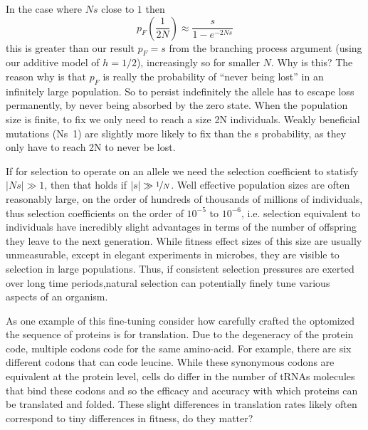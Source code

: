 In the case where $Ns$ close to $1$ then
\begin{equation}
p_F \left( \frac{1}{2N} \right) \approx \frac{s}{1-e^{-2Ns}} \label{eqn:escape_from_intro}
\end{equation}
this is greater than our result $p_F=s$ from the branching process
argument (using our additive model of $h=1/2$), increasingly so for smaller $N$. 
Why is this?  The reason why is that $p_F$ is really the probability
of “never being lost” in an infinitely large population. So to persist
indefinitely the allele has to escape loss permanently, by never being
absorbed by the zero state. When the population size is finite, to fix
we only need to reach a size 2N individuals. Weakly beneficial
mutations (Ns~1) are slightly more likely to fix than the s
probability, as they only have to reach 2N to never be lost.

If for selection to operate on an allele we need the selection coefficient to statisfy
$|Ns|\gg 1$, then that holds if $|s|\gg \nicefrac{1}{N}$. 
Well effective population sizes are often reasonably large, on the
order of hundreds of thousands of millions of individuals, thus selection
coefficients on the order of $10^{-5}$ to $10^{-6}$, i.e. selection
equivalent to individuals have incredibly slight advantages in terms
of the number of offspring they leave to the next generation.
While fitness effect sizes of this size are usually unmeasurable,
except in elegant experiments in microbes, they are visible to
selection in large populations. Thus, if consistent selection pressures are exerted over long
time periods,natural selection can potentially finely tune various
aspects of an organism.

As one example of this fine-tuning consider how carefully crafted the
optomized the sequence of proteins is for translation. Due to the
degeneracy of the protein code, multiple codons code for the same
amino-acid. For example, there are six different codons that can code
leucine. While these synonymous codons are equivalent at the protein
level, cells do differ in the number of tRNAs molecules that bind
these codons and so the efficacy and accuracy with which proteins can be
translated and folded.  These slight differences in translation rates
likely often correspond to tiny differences in fitness, do they
matter? 



